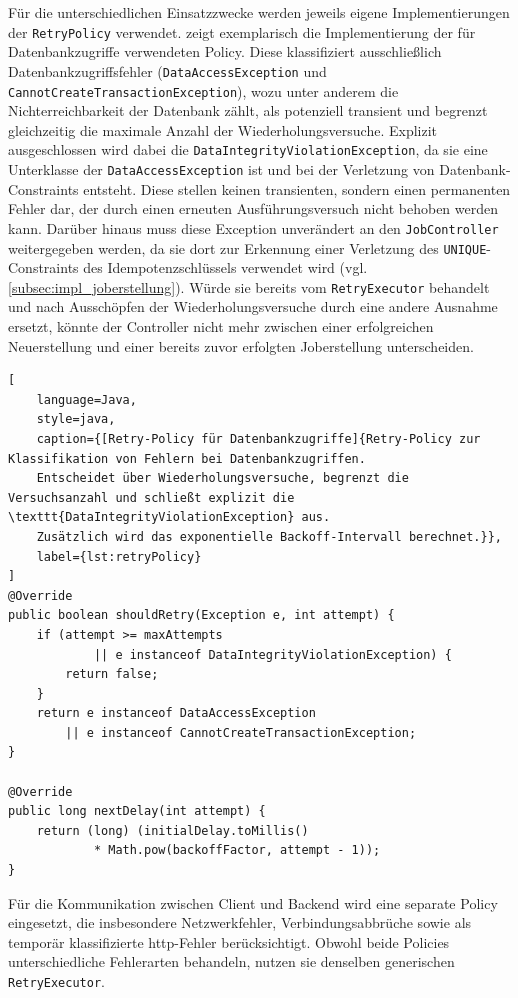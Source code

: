 Für die unterschiedlichen Einsatzzwecke werden jeweils eigene Implementierungen der \texttt{RetryPolicy} verwendet.
 zeigt exemplarisch die Implementierung der für Datenbankzugriffe verwendeten Policy.
Diese klassifiziert ausschließlich Datenbankzugriffsfehler (\texttt{DataAccessException} und \texttt{CannotCreateTransactionException}),
wozu unter anderem die Nichterreichbarkeit der Datenbank zählt, als potenziell transient und begrenzt gleichzeitig die
maximale Anzahl der Wiederholungsversuche.
Explizit ausgeschlossen wird dabei die \texttt{DataIntegrityViolationException}, da sie eine Unterklasse der
\texttt{DataAccessException} ist und bei der Verletzung von Datenbank-Constraints entsteht.
Diese stellen keinen transienten, sondern einen permanenten Fehler dar, der durch einen erneuten Ausführungsversuch nicht behoben werden kann.
Darüber hinaus muss diese Exception unverändert an den \texttt{JobController} weitergegeben werden, da sie dort zur Erkennung
einer Verletzung des \texttt{UNIQUE}-Constraints des Idempotenzschlüssels verwendet wird (vgl. \cref{subsec:impl_joberstellung}).
Würde sie bereits vom \texttt{RetryExecutor} behandelt und nach Ausschöpfen der Wiederholungsversuche durch eine andere
Ausnahme ersetzt, könnte der Controller nicht mehr zwischen einer erfolgreichen Neuerstellung und einer bereits zuvor
erfolgten Joberstellung unterscheiden.
\newpage
\begin{lstlisting}[
    language=Java,
    style=java,
    caption={[Retry-Policy für Datenbankzugriffe]{Retry-Policy zur Klassifikation von Fehlern bei Datenbankzugriffen.
    Entscheidet über Wiederholungsversuche, begrenzt die Versuchsanzahl und schließt explizit die \texttt{DataIntegrityViolationException} aus.
    Zusätzlich wird das exponentielle Backoff-Intervall berechnet.}},
    label={lst:retryPolicy}
]
@Override
public boolean shouldRetry(Exception e, int attempt) {
    if (attempt >= maxAttempts
            || e instanceof DataIntegrityViolationException) {
        return false;
    }
    return e instanceof DataAccessException
        || e instanceof CannotCreateTransactionException;
}

@Override
public long nextDelay(int attempt) {
    return (long) (initialDelay.toMillis()
            * Math.pow(backoffFactor, attempt - 1));
}
\end{lstlisting}

Für die Kommunikation zwischen Client und Backend wird eine separate Policy eingesetzt, die insbesondere
Netzwerkfehler, Verbindungsabbrüche sowie als temporär klassifizierte \gls{http}-Fehler berücksichtigt.
Obwohl beide Policies unterschiedliche Fehlerarten behandeln, nutzen sie denselben generischen \texttt{RetryExecutor}.

